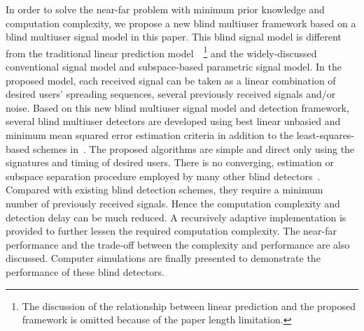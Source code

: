 \documentclass[a4paper,10pt,fleqn, twocolumn]{IEEETran}
\begin{document}
In order to solve the near-far problem with minimum prior
knowledge and computation complexity, we propose a new blind
multiuser framework based on a blind multiuser signal model in
this paper. This blind signal model is different from the
traditional linear prediction model~\cite{Haykin96}~\footnote{The
discussion of the relationship between linear prediction and the
proposed framework is omitted because of the paper length
limitation.} and the widely-discussed conventional signal model
and subspace-based parametric signal model. In the proposed model,
each received signal can be taken as a linear combination of
desired users' spreading sequences, several previously received
signals and/or noise. Based on this new blind multiuser signal
model and detection framework, several blind multiuser detectors
are developed using best linear unbasied and minimum mean squared
error estimation criteria in addition to the least-squares-based
schemes in~\cite{Wang03d,Wang03e}. The proposed algorithms are
simple and direct only using the signatures and timing of desired
users. There is no converging, estimation or subspace separation
procedure employed by many other blind
detectors~\cite{Madh94,Honi95,Wang98,Wang99}. Compared with
existing blind detection schemes, they require a minimum number of
previously received signals. Hence the computation complexity and
detection delay can be much reduced. A recursively adaptive
implementation is provided to further lessen the required
computation complexity. The near-far performance and the trade-off
between the complexity and performance are also discussed.
Computer simulations are finally presented to demonstrate the
performance of these blind detectors.
\end{document}
